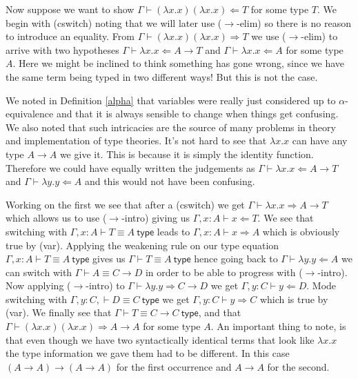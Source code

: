 \begin{example}\label{ayeaye}
    Now suppose we want to show $\Gamma \vdash (\lambda x . x)(\lambda x . x) \Leftarrow T$ for some type $T$. We begin with (cswitch) noting that we will later use ($\to$-elim) so there is no reason to introduce an equality. From $\Gamma \vdash (\lambda x . x)(\lambda x . x) \Rightarrow T$ we use ($\to$-elim) to arrive with two hypotheses $\Gamma \vdash \lambda x . x \Leftarrow A \to T$ and $\Gamma \vdash \lambda x. x \Leftarrow A$ for some type $A$. Here we might be inclined to think something has gone wrong, since we have the same term being typed in two different ways! But this is not the case.
    
    We noted in Definition \ref{alpha} that variables were really just considered up to $\alpha$-equivalence and that it is always sensible to change when things get confusing. We also noted that such intricacies are the source of many problems in theory and implementation of type theories.
    It's not hard to see that $\lambda x . x$ can have any type $A \to A$ we give it. This is because it is simply the identity function. Therefore we could have equally written the judgements as $\Gamma \vdash \lambda x . x \Leftarrow A \to T$ and $\Gamma \vdash \lambda y . y \Leftarrow A$ and this would not have been confusing.
    
    Working on the first we see that after a (cswitch) we get $\Gamma \vdash \lambda x . x \Rightarrow A \to T$ which allows us to use ($\to$-intro) giving us $\Gamma , x : A\vdash x \Leftarrow T$. We see that switching with $\Gamma , x : A \vdash T \equiv A \ \mathsf{type}$ leads to $\Gamma , x : A \vdash x \Rightarrow A$ which is obviously true by (var).
    Applying the weakening rule on our type equation $\Gamma , x : A \vdash T \equiv A \ \mathsf{type}$ gives us $\Gamma \vdash T \equiv A \ \mathsf{type}$ hence going back to $\Gamma \vdash \lambda y . y \Leftarrow A$ we can switch with $\Gamma \vdash A \equiv C \to D$ in order to be able to progress with ($\to$-intro).
    Now applying ($\to$-intro) to $\Gamma \vdash \lambda y . y \Rightarrow C \to D$ we get $\Gamma , y : C \vdash y \Leftarrow D$. Mode switching with $\Gamma , y : C, \vdash D \equiv C \ \mathsf{type}$ we get $\Gamma , y : C \vdash y \Rightarrow C$ which is true by (var).
    We finally see that $\Gamma \vdash T \equiv C \to C\ \mathsf{type}$, and that $\Gamma \vdash (\lambda x . x)(\lambda x . x) \Rightarrow A \to A$ for some type $A$. An important thing to note, is that even though we have two syntactically identical terms that look like $\lambda x . x$ the type information we gave them had to be different. In this case $(A \to A) \to (A \to A)$ for the first occurrence and $A \to A$ for the second. 


\end{example}
